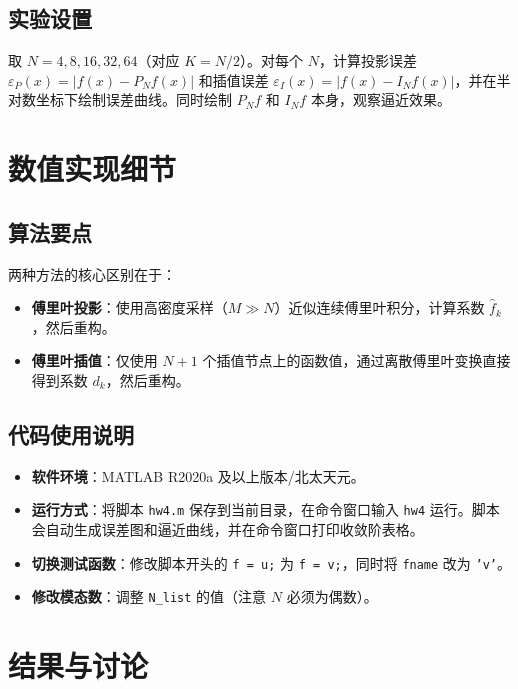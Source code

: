 \documentclass{article}
\begin{document}
\subsection{实验设置}
取 $N = 4, 8, 16, 32, 64$（对应 $K=N/2$）。对每个 $N$，计算投影误差 $\varepsilon_P(x)=|f(x)-P_N f(x)|$ 和插值误差 $\varepsilon_I(x)=|f(x)-I_N f(x)|$，并在半对数坐标下绘制误差曲线。同时绘制 $P_N f$ 和 $I_N f$ 本身，观察逼近效果。

\section{数值实现细节}

\subsection{算法要点}
两种方法的核心区别在于：
\begin{itemize}
  \item \textbf{傅里叶投影}：使用高密度采样（$M \gg N$）近似连续傅里叶积分，计算系数 $\hat{f}_k$，然后重构。
  \item \textbf{傅里叶插值}：仅使用 $N+1$ 个插值节点上的函数值，通过离散傅里叶变换直接得到系数 $d_k$，然后重构。
\end{itemize}

\subsection{代码使用说明}
\begin{itemize}
  \item \textbf{软件环境}：MATLAB R2020a 及以上版本/北太天元。
  \item \textbf{运行方式}：将脚本 \texttt{hw4.m} 保存到当前目录，在命令窗口输入 \texttt{hw4} 运行。脚本会自动生成误差图和逼近曲线，并在命令窗口打印收敛阶表格。
  \item \textbf{切换测试函数}：修改脚本开头的 \texttt{f = u;} 为 \texttt{f = v;}，同时将 \texttt{fname} 改为 \texttt{'v'}。
  \item \textbf{修改模态数}：调整 \texttt{N\_list} 的值（注意 $N$ 必须为偶数）。
\end{itemize}

\section{结果与讨论}
\end{document}
